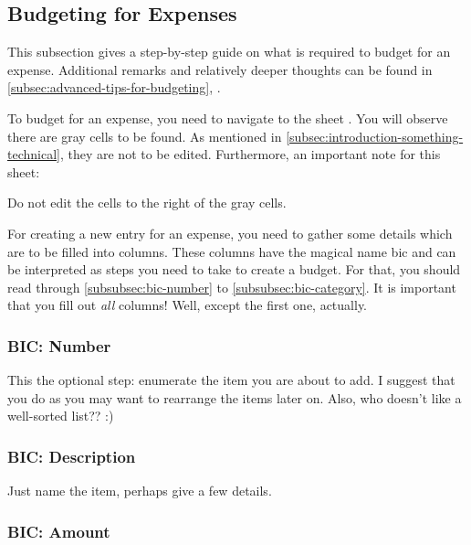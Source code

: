 \subsection{Budgeting for Expenses}
\label{subsec:budgeting-expenses}

This subsection gives a step-by-step guide on what is required to budget for an expense.
Additional remarks and relatively deeper thoughts can be found in \autoref{subsec:advanced-tips-for-budgeting}, .

To budget for an expense, you need to navigate to the sheet .
You will observe there are gray cells to be found.
As mentioned in \autoref{subsec:introduction-something-technical}, they are not to be edited.
Furthermore, an important note for this sheet:
\begin{specialnote}
	Do not edit the cells to the right of the gray cells.
\end{specialnote}

For creating a new entry for an expense, you need to gather some details which are to be filled into columns.
These columns have the magical name \ac{bic} and can be interpreted as steps you need to take to create a budget.
For that, you should read through \autoref{subsubsec:bic-number} to \autoref{subsubsec:bic-category}.
It is important that you fill out \emph{all} columns!
Well, except the first one, actually.

\subsubsection{BIC: Number}
\label{subsubsec:bic-number}

This the optional step: enumerate the item you are about to add.
I suggest that you do as you may want to rearrange the items later on.
Also, who doesn't like a well-sorted list?? :)

\subsubsection{BIC: Description}
\label{subsubsec:bic-description}

Just name the item, perhaps give a few details.

\subsubsection{BIC: Amount}
\label{subsubsec:bic-amount}


